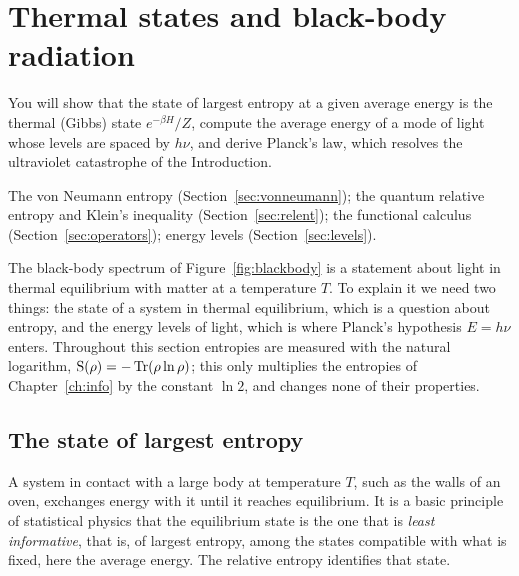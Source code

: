 \section{Thermal states and black-body radiation}\label{sec:blackbody}

\begin{objectives}
  You will show that the state of largest entropy at a given average energy is the thermal (Gibbs) state $e^{-\beta H}/Z$, compute the average energy of a mode of light whose levels are spaced by $h\nu$, and derive Planck's law, which resolves the ultraviolet catastrophe of the Introduction.
\end{objectives}

\begin{recall}
  The von Neumann entropy (Section~\ref{sec:vonneumann}); the quantum relative entropy and Klein's inequality (Section~\ref{sec:relent}); the functional calculus (Section~\ref{sec:operators}); energy levels (Section~\ref{sec:levels}).
\end{recall}

The black-body spectrum of Figure~\ref{fig:blackbody} is a statement about light in thermal equilibrium with matter at a temperature $T$. To explain it we need two things: the state of a system in thermal equilibrium, which is a question about entropy, and the energy levels of light, which is where Planck's hypothesis $E=h\nu$ enters. Throughout this section entropies are measured with the natural logarithm, $\mathrm{S}(\rho)=-\operatorname{Tr}(\rho\ln\rho)$; this only multiplies the entropies of Chapter~\ref{ch:info} by the constant $\ln2$, and changes none of their properties.

\subsection{The state of largest entropy}

A system in contact with a large body at temperature $T$, such as the walls of an oven, exchanges energy with it until it reaches equilibrium. It is a basic principle of statistical physics that the equilibrium state is the one that is \emph{least informative}, that is, of largest entropy, among the states compatible with what is fixed, here the average energy. The relative entropy identifies that state.


